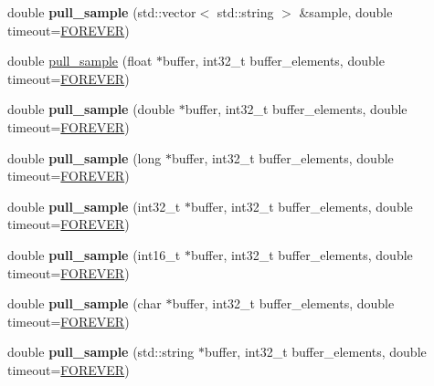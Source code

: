 \begin{DoxyCompactItemize}
double {\bfseries pull\+\_\+sample} (std\+::vector$<$ std\+::string $>$ \&sample, double timeout=\hyperlink{namespacelsl_a74cfbc9077aca21295117217249721ed}{F\+O\+R\+E\+V\+ER})
\item 
double \hyperlink{classlsl_1_1stream__inlet_a4a10bd640a10c317ba4a0244cc986146}{pull\+\_\+sample} (float $\ast$buffer, int32\+\_\+t buffer\+\_\+elements, double timeout=\hyperlink{namespacelsl_a74cfbc9077aca21295117217249721ed}{F\+O\+R\+E\+V\+ER})
\item 
\mbox{\label{classlsl_1_1stream__inlet_acb78fe666a3be090278bc3d1f3eb7619}} 
double {\bfseries pull\+\_\+sample} (double $\ast$buffer, int32\+\_\+t buffer\+\_\+elements, double timeout=\hyperlink{namespacelsl_a74cfbc9077aca21295117217249721ed}{F\+O\+R\+E\+V\+ER})
\item 
\mbox{\label{classlsl_1_1stream__inlet_a774c17a647ebd321b5ce4a5450f71202}} 
double {\bfseries pull\+\_\+sample} (long $\ast$buffer, int32\+\_\+t buffer\+\_\+elements, double timeout=\hyperlink{namespacelsl_a74cfbc9077aca21295117217249721ed}{F\+O\+R\+E\+V\+ER})
\item 
\mbox{\label{classlsl_1_1stream__inlet_ae4534102453ccd98f319c746ec1de0a9}} 
double {\bfseries pull\+\_\+sample} (int32\+\_\+t $\ast$buffer, int32\+\_\+t buffer\+\_\+elements, double timeout=\hyperlink{namespacelsl_a74cfbc9077aca21295117217249721ed}{F\+O\+R\+E\+V\+ER})
\item 
\mbox{\label{classlsl_1_1stream__inlet_a3462f2634ce13e7f9c764e16a58a71a6}} 
double {\bfseries pull\+\_\+sample} (int16\+\_\+t $\ast$buffer, int32\+\_\+t buffer\+\_\+elements, double timeout=\hyperlink{namespacelsl_a74cfbc9077aca21295117217249721ed}{F\+O\+R\+E\+V\+ER})
\item 
\mbox{\label{classlsl_1_1stream__inlet_a9183e81a122df862eff9ea9797c82b73}} 
double {\bfseries pull\+\_\+sample} (char $\ast$buffer, int32\+\_\+t buffer\+\_\+elements, double timeout=\hyperlink{namespacelsl_a74cfbc9077aca21295117217249721ed}{F\+O\+R\+E\+V\+ER})
\item 
\mbox{\label{classlsl_1_1stream__inlet_a52e95747438991868e3eb9c791e24f42}} 
double {\bfseries pull\+\_\+sample} (std\+::string $\ast$buffer, int32\+\_\+t buffer\+\_\+elements, double timeout=\hyperlink{namespacelsl_a74cfbc9077aca21295117217249721ed}{F\+O\+R\+E\+V\+ER})

\end{DoxyCompactItemize}
